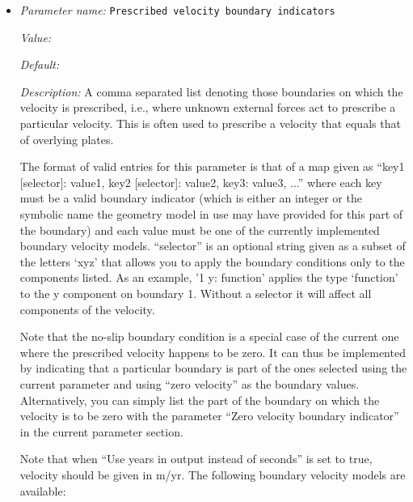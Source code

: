 \begin{itemize}
\item {\it Parameter name:} {\tt Prescribed velocity boundary indicators}
\label{parameters:Boundary velocity model/Prescribed velocity boundary indicators}


{\it Value:} 


{\it Default:} 


{\it Description:} A comma separated list denoting those boundaries on which the velocity is prescribed, i.e., where unknown external forces act to prescribe a particular velocity. This is often used to prescribe a velocity that equals that of overlying plates.

The format of valid entries for this parameter is that of a map given as ``key1 [selector]: value1, key2 [selector]: value2, key3: value3, ...'' where each key must be a valid boundary indicator (which is either an integer or the symbolic name the geometry model in use may have provided for this part of the boundary) and each value must be one of the currently implemented boundary velocity models. ``selector'' is an optional string given as a subset of the letters `xyz' that allows you to apply the boundary conditions only to the components listed. As an example, '1 y: function' applies the type `function' to the y component on boundary 1. Without a selector it will affect all components of the velocity.

Note that the no-slip boundary condition is a special case of the current one where the prescribed velocity happens to be zero. It can thus be implemented by indicating that a particular boundary is part of the ones selected using the current parameter and using ``zero velocity'' as the boundary values. Alternatively, you can simply list the part of the boundary on which the velocity is to be zero with the parameter ``Zero velocity boundary indicator'' in the current parameter section.

Note that when ``Use years in output instead of seconds'' is set to true, velocity should be given in m/yr. The following boundary velocity models are available:


\end{itemize}
